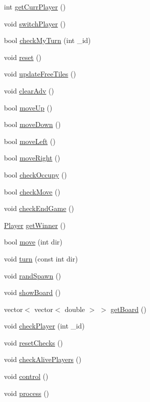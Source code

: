 \begin{DoxyCompactItemize}
\item 
int \hyperlink{classBoard_abb55568a079fa7c9d22b87072e47a80d}{get\-Curr\-Player} ()
\item 
void \hyperlink{classBoard_a6443db7c16e3b023e9f0ebd106a89e2c}{switch\-Player} ()
\item 
bool \hyperlink{classBoard_a28379792709ccb4bc0fc1c37f1788b57}{check\-My\-Turn} (int \-\_\-id)
\item 
void \hyperlink{classBoard_aaef819a8d1a10c35d9f802195802236e}{reset} ()
\item 
void \hyperlink{classBoard_afcd4fcf5cbe57ff612f43a3fcb9a336f}{update\-Free\-Tiles} ()
\item 
void \hyperlink{classBoard_a43d0ddf4bb8fb210425cb3e3d335ee91}{clear\-Adv} ()
\item 
bool \hyperlink{classBoard_a12ed975322d7b6a9ca26cf2b465a510b}{move\-Up} ()
\item 
bool \hyperlink{classBoard_a60a65f6aea6073ce6140537f3999a07c}{move\-Down} ()
\item 
bool \hyperlink{classBoard_a1517b03dc55270808428a671ea65f16b}{move\-Left} ()
\item 
bool \hyperlink{classBoard_a908e8252a3ec8fd89063d3336992b265}{move\-Right} ()
\item 
bool \hyperlink{classBoard_ac66859886670f6412ae98fe376d1869e}{check\-Occupy} ()
\item 
bool \hyperlink{classBoard_afe79236d857a27b5f41135ab7d314d11}{check\-Move} ()
\item 
void \hyperlink{classBoard_af3e095aaddc5a5d42dbce1e9f09613ac}{check\-End\-Game} ()
\item 
\hyperlink{classPlayer}{Player} \hyperlink{classBoard_ab8ac6a56bc3f1d23c17091b247f4846c}{get\-Winner} ()
\item 
bool \hyperlink{classBoard_a8ff148a0bc62644e38fd0e4dc62e6aa8}{move} (int dir)
\item 
void \hyperlink{classBoard_a83efc5312ec74972d092f1feb8a634cc}{turn} (const int dir)
\item 
void \hyperlink{classBoard_a292092da6bf7e9d034a253b8badb29ec}{rand\-Spawn} ()
\item 
void \hyperlink{classBoard_a4c7d8fa323cbc2163d9375bbf52e8b07}{show\-Board} ()
\item 
vector$<$ vector$<$ double $>$ $>$ \hyperlink{classBoard_af9e342842a0b219ecfba8c2c9187b865}{get\-Board} ()
\item 
void \hyperlink{classBoard_a22e356fce939f31b3a5b37d4c6e00fdb}{check\-Player} (int \-\_\-id)
\item 
void \hyperlink{classBoard_ac9612f0921f8c6bcada7f00b8542cd6c}{reset\-Checks} ()
\item 
void \hyperlink{classBoard_a969a156e3d2f18e5474d048ac61eefec}{check\-Alive\-Players} ()
\item 
void \hyperlink{classBoard_a438f522b92c76c5de5e14e6ea1eebb25}{control} ()
\item 
void \hyperlink{classBoard_a5baa5d9c3f42b49e05864204725dd83f}{process} ()
\end{DoxyCompactItemize}
